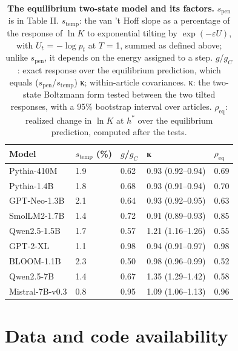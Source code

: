 \documentclass[aps,prx,onecolumn,superscriptaddress,longbibliography]{revtex4-2}
\begin{document}
\begin{table}[htbp]
\centering
\small
\setlength{\tabcolsep}{6pt}
\renewcommand{\thetable}{H1}
\caption{\textbf{The equilibrium two-state model and its factors.} \(s_{\mathrm{pen}}\) is in Table II. \(s_{\mathrm{temp}}\): the van 't Hoff slope as a percentage of the response of \(\ln K\) to exponential tilting by \(\exp(-\varepsilon U)\), with \(U_{t}\) = \(-\log p_t\) at \(T\) = 1, summed as defined above; unlike \(s_{\mathrm{pen}}\), it depends on the energy assigned to a step. \(g\)/\(g_{C}\): exact response over the equilibrium prediction, which equals (\(s_{\mathrm{pen}}\)/\(s_{\mathrm{temp}}\)) κ; within-article covariances. κ: the two-state Boltzmann form tested between the two tilted responses, with a 95\% bootstrap interval over articles. \(\rho_{\mathrm{eq}}\): realized change in \(\ln K\) at \(h^*\) over the equilibrium prediction, computed after the tests.}
\label{tabH1}
\begin{tabular}{@{}lllll@{}}
\toprule
Model & \(s_{\mathrm{temp}}\) (\%) & \(g\)/\(g_{C}\) & κ & \(\rho_{\mathrm{eq}}\) \\
\midrule
Pythia-410M & 1.9 & 0.62 & 0.93 (0.92--0.94) & 0.69 \\
Pythia-1.4B & 1.8 & 0.68 & 0.93 (0.91--0.94) & 0.70 \\
GPT-Neo-1.3B & 2.1 & 0.64 & 0.93 (0.92--0.95) & 0.63 \\
SmolLM2-1.7B & 1.4 & 0.72 & 0.91 (0.89--0.93) & 0.85 \\
Qwen2.5-1.5B & 1.7 & 0.57 & 1.21 (1.16--1.26) & 0.55 \\
GPT-2-XL & 1.1 & 0.98 & 0.94 (0.91--0.97) & 0.98 \\
BLOOM-1.1B & 2.3 & 0.50 & 0.98 (0.96--0.99) & 0.52 \\
Qwen2.5-7B & 1.4 & 0.67 & 1.35 (1.29--1.42) & 0.58 \\
Mistral-7B-v0.3 & 0.8 & 0.95 & 1.09 (1.06--1.13) & 0.96 \\
\bottomrule
\end{tabular}
\end{table}


\section*{Data and code availability}
\end{document}
